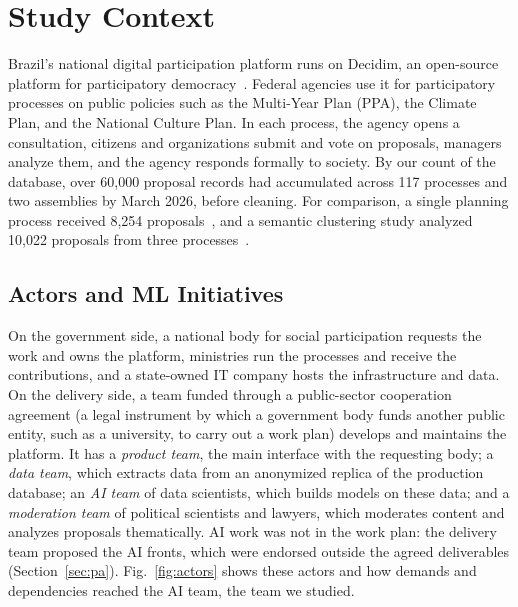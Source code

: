 \documentclass[sigconf,nonacm]{acmart}
\newif\ifshownotes
\newcommand{\rnote}[1]{\ifshownotes{\color{red}\textbf{[R:} #1\textbf{]}}\fi}
\newcommand{\csnote}[1]{\ifshownotes{\color{orange}\textbf{[CS:} #1\textbf{]}}\fi}
\begin{document}


\section{Study Context}
\label{sec:context}

Brazil's national digital participation platform runs on Decidim, an open-source platform for participatory democracy~\cite{barandiaran2024}. Federal agencies use it for participatory processes on public policies such as the Multi-Year Plan (PPA), the Climate Plan, and the National Culture Plan. In each process, the agency opens a consultation, citizens and organizations submit and vote on proposals, managers analyze them, and the agency responds formally to society. By our count of the database, over 60,000 proposal records had accumulated across 117 processes and two assemblies by March 2026, before cleaning. For comparison, a single planning process received 8,254 proposals~\cite{jardim2024ppa}, and a semantic clustering study analyzed 10,022 proposals from three processes~\cite{ferreira2025semantic}.

\subsection{Actors and ML Initiatives}

On the government side, a national body for social participation requests the work and owns the platform, ministries run the processes and receive the contributions, and a state-owned IT company hosts the infrastructure and data. On the delivery side, a team funded through a public-sector cooperation agreement (a legal instrument by which a government body funds another public entity, such as a university, to carry out a work plan) develops and maintains the platform. It has a \emph{product team}, the main interface with the requesting body; a \emph{data team}, which extracts data from an anonymized replica of the production database; an \emph{AI team} of data scientists, which builds models on these data; and a \emph{moderation team} of political scientists and lawyers, which moderates content and analyzes proposals thematically. AI work was not in the work plan: the delivery team proposed the AI fronts, which were endorsed outside the agreed deliverables (Section~\ref{sec:pa}). Fig.~\ref{fig:actors} shows these actors and how demands and dependencies reached the AI team, the team we studied.
\end{document}
